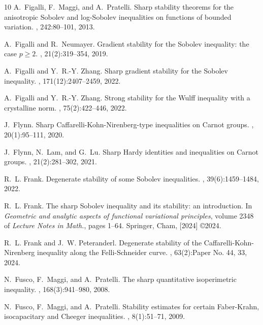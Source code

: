 \documentclass[a4paper,12pt]{article}
\theoremstyle{plain}
\theoremstyle{definition}
\theoremstyle{remark}
\numberwithin{equation}{section}
\begin{document}
\begin{thebibliography}{10}
A.~Figalli, F.~Maggi, and A.~Pratelli.
\newblock Sharp stability theorems for the anisotropic {S}obolev and
  log-{S}obolev inequalities on functions of bounded variation.
, 242:80--101, 2013.

A.~Figalli and R.~Neumayer.
\newblock Gradient stability for the {S}obolev inequality: the case {$p\geq
  2$}.
, 21(2):319--354, 2019.

A.~Figalli and Y.~R.-Y. Zhang.
\newblock Sharp gradient stability for the {S}obolev inequality.
, 171(12):2407--2459, 2022.

A.~Figalli and Y.~R.-Y. Zhang.
\newblock Strong stability for the {W}ulff inequality with a crystalline norm.
, 75(2):422--446, 2022.

J.~Flynn.
\newblock Sharp {C}affarelli-{K}ohn-{N}irenberg-type inequalities on {C}arnot
  groups.
, 20(1):95--111, 2020.

J.~Flynn, N.~Lam, and G.~Lu.
\newblock Sharp {H}ardy identities and inequalities on {C}arnot groups.
, 21(2):281--302, 2021.

R.~L. Frank.
\newblock Degenerate stability of some {S}obolev inequalities.
,
  39(6):1459--1484, 2022.

R.~L. Frank.
\newblock The sharp {S}obolev inequality and its stability: an introduction.
\newblock In {\em Geometric and analytic aspects of functional variational
  principles}, volume 2348 of {\em Lecture Notes in Math.}, pages 1--64.
  Springer, Cham, [2024] \copyright 2024.

R.~L. Frank and J.~W. Peteranderl.
\newblock Degenerate stability of the {C}affarelli-{K}ohn-{N}irenberg
  inequality along the {F}elli-{S}chneider curve.
, 63(2):Paper No. 44,
  33, 2024.

N.~Fusco, F.~Maggi, and A.~Pratelli.
\newblock The sharp quantitative isoperimetric inequality.
, 168(3):941--980, 2008.

N.~Fusco, F.~Maggi, and A.~Pratelli.
\newblock Stability estimates for certain {F}aber-{K}rahn, isocapacitary and
  {C}heeger inequalities.
, 8(1):51--71, 2009.


\end{thebibliography}
\end{document}
